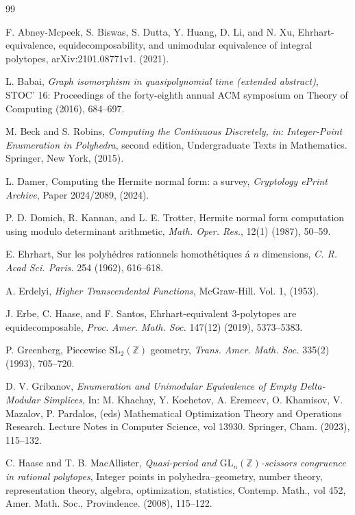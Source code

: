\documentclass[reqno, 12pt]{article}
\theoremstyle{mydefinition}
\theoremstyle{myremark}
\numberwithin{algorithm}{section}
\begin{document}
\begin{thebibliography}{99}

 F. Abney-Mcpeek, S. Biswas, S. Dutta, Y. Huang, D. Li, and N. Xu, Ehrhart-equivalence, equidecomposability, and unimodular equivalence of integral polytopes, arXiv:2101.08771v1. (2021).

 L. Babai, \emph{Graph isomorphism in quasipolynomial time (extended abstract)}, STOC' 16: Proceedings of the forty-eighth annual ACM symposium on Theory of Computing (2016), 684--697.

 M. Beck and S. Robins, \emph{Computing the Continuous Discretely, in: Integer-Point Enumeration in Polyhedra}, second edition, Undergraduate Texts in Mathematics. Springer, New York, (2015).

 L. Damer, Computing the Hermite normal form: a survey, \emph{Cryptology ePrint Archive}, Paper 2024/2089, (2024).

 P. D. Domich, R. Kannan, and L. E. Trotter, Hermite normal form computation using modulo determinant arithmetic, \emph{Math. Oper. Res.}, 12(1) (1987), 50--59.

 E. Ehrhart, Sur les polyh\'edres rationnels homoth\'etiques \'a $n$ dimensions, \emph{C. R. Acad Sci. Paris.} 254 (1962), 616--618.

 A. Erdelyi, \emph{Higher Transcendental Functions}, McGraw-Hill. Vol. 1, (1953).

 J. Erbe, C. Haase, and F. Santos, Ehrhart-equivalent 3-polytopes are equidecomposable, \emph{Proc. Amer. Math. Soc.} 147(12) (2019), 5373--5383.

 P. Greenberg, Piecewise $\mathrm{SL}_2(\mathbb{Z})$ geometry, \emph{Trans. Amer. Math. Soc.} 335(2) (1993), 705--720.


 D. V. Gribanov, \emph{Enumeration and Unimodular Equivalence of Empty Delta-Modular Simplices}, In: M. Khachay, Y. Kochetov, A. Eremeev, O. Khamisov, V. Mazalov, P. Pardalos, (eds) Mathematical Optimization Theory and Operations Research. Lecture Notes in Computer Science, vol 13930. Springer, Cham. (2023), 115--132.

 C. Haase and T. B. MacAllister, \emph{Quasi-period and $\mathrm{GL}_n(\mathbb{Z})$-scissors congruence in rational polytopes}, Integer points in polyhedra--geometry, number theory, representation theory, algebra, optimization, statistics, Contemp. Math., vol 452, Amer. Math. Soc., Provindence. (2008), 115--122.


\end{thebibliography}
\end{document}
